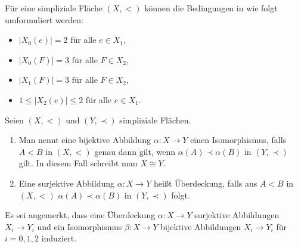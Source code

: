 \documentclass[12pt,titlepage]{article}
\begin{document}
\begin{bemerkung}
Für eine simpliziale Fläche $(X,<)$ können die Bedingungen in  wie folgt umformuliert werden:
\begin{itemize}
\item $\vert X_{0}(e)\vert=2$ für alle $e \in X_{1}$,
\item $\vert X_{0}(F)\vert=3$ für alle $F \in X_{2}$,
\item $\vert X_{1}(F)\vert=3$ für alle $F \in X_{2}$,
\item $1\leq  \vert X_{2}(e)\vert \leq 2$ für alle $e \in X_{1}$.

\end{itemize}
\end{bemerkung}

\begin{definition} Seien $(X,<)$ und $(Y,\prec)$ simpliziale Flächen.
\begin{enumerate}
 \item Man nennt eine bijektive Abbildung $\alpha: X \to Y$ einen Isomorphismus, falls $A<B$ in $(X,<)$ genau dann gilt, wenn $\alpha(A) \prec \alpha(B)$ in $(Y,\prec)$ gilt. In diesem Fall schreibt man $X \cong Y$.
\item Eine surjektive Abbildung $\alpha: X \to Y$ heißt Überdeckung, falls aus $A<B$ in $(X,<)$  $\alpha(A) \prec \alpha(B)$ in $(Y,\prec)$ folgt. 
\end{enumerate}
\end{definition}
Es sei angemerkt, dass eine Überdeckung $\alpha:X\to Y$ surjektive Abbildungen $X_{i} \to Y_{i}$ und ein Isomorphismus $\beta:X \to Y$ bijektive Abbildungen $X_{i} \to Y_{i}$ für $i=0,1,2$ induziert.
\end{document}
